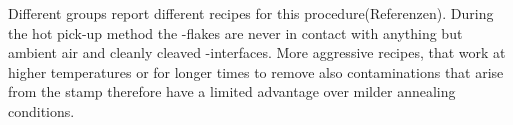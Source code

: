 Different groups report different recipes for this procedure(Referenzen). During the hot pick-up method the \tmd-flakes are never in contact with anything but ambient air and cleanly cleaved \hbn-interfaces. More aggressive recipes, that work at higher temperatures or for longer times to remove also contaminations that arise from the stamp therefore have a limited advantage over milder annealing conditions.